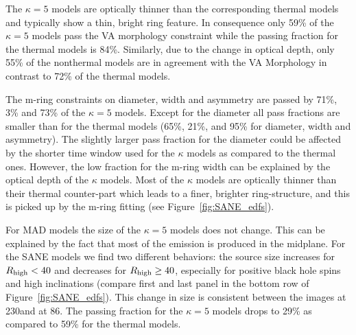 

The $\kappa=5$ models are optically thinner than the corresponding thermal models and typically show a thin, bright ring feature.
In consequence only 59\% of the $\kappa=5$ models pass the VA morphology constraint while the passing fraction for the thermal models is 84\%.
Similarly, due to the change in optical depth, only 55\% of the nonthermal models are in agreement with the VA Morphology in contrast to 72\% of the thermal models.


The m-ring constraints on diameter, width and asymmetry are passed by 71\%, 3\% and 73\% of the $\kappa=5$ models.
Except for the diameter all pass fractions are smaller than for the thermal models (65\%, 21\%, and 95\% for diameter, width and asymmetry).
The slightly larger pass fraction for the diameter could be affected by the shorter time window used for the $\kappa$ models as compared to the thermal ones.
However, the low fraction for the m-ring width can be explained by the optical depth of the $\kappa$ models.
Most of the $\kappa$ models are optically thinner than their thermal counter-part which leads to a finer, brighter ring-structure, and this is picked up by the m-ring fitting (see Figure~\ref{fig:SANE_edfs}).


For MAD models the size of the $\kappa=5$ models does not change.
This can be explained by the fact that most of the emission is produced in the midplane.
For the SANE models we find two different behaviors: the source size increases for $R_\mathrm{high} < 40$ and decreases for $R_\mathrm{high} \geq 40$, especially for positive black hole spins and high inclinations (compare first and last panel in the bottom row of Figure~\ref{fig:SANE_edfs}).
This change in size is consistent between the images at 230\GHz and at 86\GHz.
The passing fraction for the $\kappa=5$ models drops to 29\% as compared to 59\% for the thermal models.


